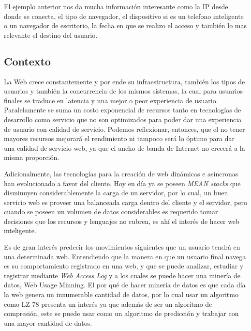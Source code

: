 \begin{verbatim}
  \end{verbatim}

  El ejemplo anterior nos da mucha información interesante como la IP desde donde se conecta, el tipo de navegador, el dispositivo si es un telefono inteligente o un navegador de escritorio, la fecha en que se realizo el acceso y también lo mas relevante el destino del usuario.


\subsection{Contexto}
  \label{sec:contexto}

  La Web crece constantemente y por ende su infraestructura, también los tipos de usuarios y  también la concurrencia de los mismos sistemas, la cual para usuarios finales se traduce en latencia y una mejor o peor experiencia de usuario. 
  Paralelamente se suma un costo exponencial de recursos tanto en tecnologías de desarrollo como servicio que no son optimizados para poder dar una experiencia de usuario con calidad de servicio. Podemos reflexionar, entonces, que el no tener mayores recursos mejorará el rendimiento ni tampoco será lo óptimo para dar una calidad de servicio web, ya que el ancho de banda de Internet no crecerá a la misma proporción.
   
  Adicionalmente, las tecnologías para la creación de web dinámicas e asíncronas han evolucionado a favor del cliente.
  Hoy en día ya se poseen \emph{MEAN stacks} que disminuyen considerablemente la carga de un servidor, por lo cual, un buen servicio web es proveer una balanceada carga dentro del cliente y el servidor, pero cuando se poseen un volumen de datos considerables es requerido tomar decisiones que los recursos y lenguajes no cubren, es ahí el interés de hacer  web inteligente.

  Es de gran interés predecir los movimientos siguientes que un usuario tendrá en una determinada web.
  Entendiendo que la manera en que un usuario final navega es su comportamiento registrado en una web, y que se puede analizar, estudiar y registrar mediante \emph{Web Access Log} y a los cuales se puede hacer una minería de datos, Web Usage Minning. El por qué de hacer minería de datos es que cada día la web genera un innumerable cantidad de datos, por lo cual usar un algoritmo como LZ 78 presenta un interés ya que además de ser un algoritmo de compresión, este se puede usar como un algoritmo de predicción y trabajar con una mayor cantidad de datos.
  
